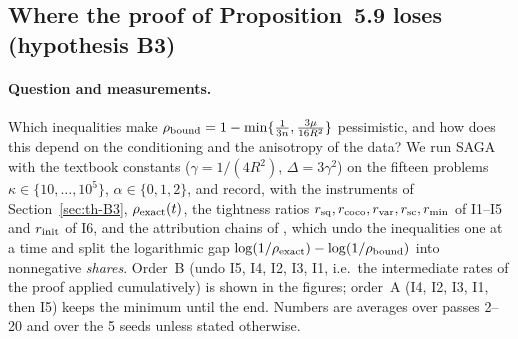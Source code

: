 \subsection{Where the proof of Proposition~5.9 loses (hypothesis B3)}\label{sec:exp-B3}

\paragraph{Question and measurements.}
Which inequalities make $\rho_{\rm bound}=1-\min\{\frac1{3n},\frac{3\mu}{16R^2}\}$ pessimistic, and how does this depend
on the conditioning and the anisotropy of the data? We run SAGA with the textbook constants ($\gamma=1/(4R^2)$,
$\Delta=3\gamma^2$) on the fifteen problems $\kappa\in\{10,\dots,10^5\}$, $\alpha\in\{0,1,2\}$, and record, with the
instruments of Section~\ref{sec:th-B3}, $\rho_{\rm exact}(t)$, the tightness ratios
$r_{\rm sq},r_{\rm coco},r_{\rm var},r_{\rm sc},r_{\rm min}$ of I1--I5 and $r_{\rm init}$ of I6, and the attribution chains of
, which undo the inequalities one at a time and split the logarithmic gap
$\log(1/\rho_{\rm exact})-\log(1/\rho_{\rm bound})$ into nonnegative \emph{shares}. Order~B (undo I5, I4, I2, I3, I1,
i.e.\ the intermediate rates of the proof applied cumulatively) is shown in the figures; order~A (I4, I2, I3, I1, then
I5) keeps the minimum until the end. Numbers are averages over passes 2--20 and over the 5 seeds unless stated
otherwise.

